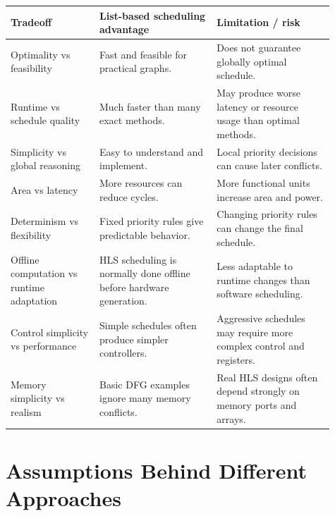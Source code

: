 \documentclass[11pt,a4paper]{article}
\begin{document}
\begin{table}[h]
\centering
\small
\begin{tabular}{p{0.25\linewidth}p{0.33\linewidth}p{0.33\linewidth}}
\toprule
Tradeoff & List-based scheduling advantage & Limitation / risk \\
\midrule
Optimality vs feasibility & Fast and feasible for practical graphs. & Does not guarantee globally optimal schedule. \\
Runtime vs schedule quality & Much faster than many exact methods. & May produce worse latency or resource usage than optimal methods. \\
Simplicity vs global reasoning & Easy to understand and implement. & Local priority decisions can cause later conflicts. \\
Area vs latency & More resources can reduce cycles. & More functional units increase area and power. \\
Determinism vs flexibility & Fixed priority rules give predictable behavior. & Changing priority rules can change the final schedule. \\
Offline computation vs runtime adaptation & HLS scheduling is normally done offline before hardware generation. & Less adaptable to runtime changes than software scheduling. \\
Control simplicity vs performance & Simple schedules often produce simpler controllers. & Aggressive schedules may require more complex control and registers. \\
Memory simplicity vs realism & Basic DFG examples ignore many memory conflicts. & Real HLS designs often depend strongly on memory ports and arrays. \\
\bottomrule
\end{tabular}
\end{table}

\section{Assumptions Behind Different Approaches}
\end{document}
